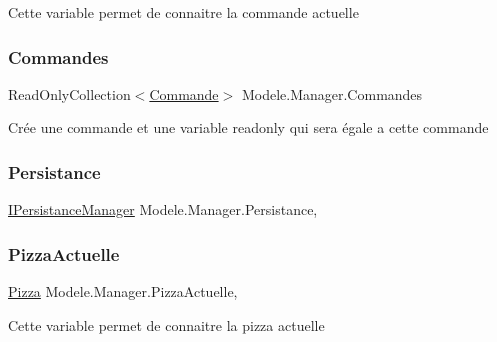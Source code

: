 Cette variable permet de connaitre la commande actuelle 

\mbox{\label{classModele_1_1Manager_a0c0ba218c22011e46bdeddff3f6ca5d0}} 
\subsubsection{\texorpdfstring{Commandes}{Commandes}}
{\footnotesize\ttfamily Read\+Only\+Collection$<$\hyperlink{classModele_1_1Commande}{Commande}$>$ Modele.\+Manager.\+Commandes\hspace{0.3cm}{\ttfamily [get]}}



Crée une commande et une variable readonly qui sera égale a cette commande 

\mbox{\label{classModele_1_1Manager_a29b4f8c42f993178aac1d16da7942324}} 
\subsubsection{\texorpdfstring{Persistance}{Persistance}}
{\footnotesize\ttfamily \hyperlink{interfaceModele_1_1IPersistanceManager}{I\+Persistance\+Manager} Modele.\+Manager.\+Persistance\hspace{0.3cm}{\ttfamily [get]}, {\ttfamily [set]}}

\mbox{\label{classModele_1_1Manager_a7e69844aeeebbc80144850efc0d2b94c}} 
\subsubsection{\texorpdfstring{Pizza\+Actuelle}{PizzaActuelle}}
{\footnotesize\ttfamily \hyperlink{classModele_1_1Pizza}{Pizza} Modele.\+Manager.\+Pizza\+Actuelle\hspace{0.3cm}{\ttfamily [get]}, {\ttfamily [set]}}



Cette variable permet de connaitre la pizza actuelle 

